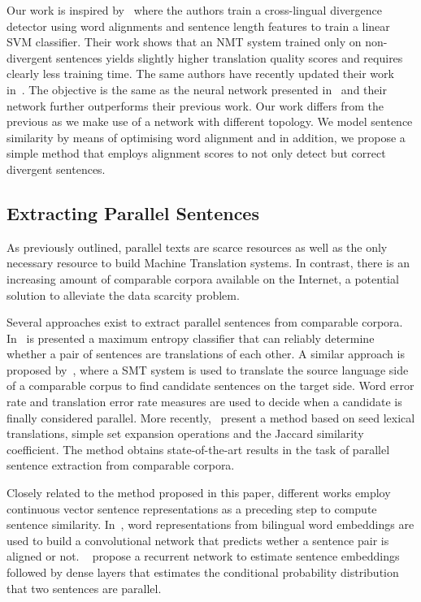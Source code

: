 \documentclass[11pt,a4paper]{article}
\begin{document}
Our work is inspired by~\cite{W17-3209} where the authors train a cross-lingual divergence detector using word alignments and sentence length features to train a linear SVM classifier. Their work shows that an NMT system trained only on non-divergent sentences yields slightly higher translation quality scores and requires clearly less training time. The same authors have recently updated their work in~\cite{DBLP:journals/corr/abs-1803-11112}. The objective is the same as the neural network presented in~\cite{N16-1108} and their network further outperforms their previous work. Our work differs from the previous as we make use of a network with different topology. We model sentence similarity by means of optimising word alignment and in addition, we propose a simple method that employs alignment scores to not only detect but correct divergent sentences.

\subsection{Extracting Parallel Sentences}

As previously outlined, parallel texts are scarce resources as well as the only necessary resource to build Machine Translation systems. In contrast, there is an increasing amount of comparable corpora available on the Internet, a potential solution to alleviate the data scarcity problem.

Several approaches exist to extract parallel sentences from comparable corpora. 
In~\cite{J05-4003} is presented a maximum entropy classifier that can reliably determine whether a pair of sentences are translations of each other. 
A similar approach is proposed by~\cite{E09-1003}, where a SMT system is used to translate the source language side of a comparable corpus to find candidate sentences on the target side. 
Word error rate and translation error rate measures are used to decide when a candidate is finally considered parallel. 
More recently,~\cite{W17-2508} present a method based on seed lexical translations, simple set expansion operations and the Jaccard similarity coefficient. The method obtains state-of-the-art results in the task of parallel sentence extraction from comparable corpora.

Closely related to the method proposed in this paper, different works employ continuous vector sentence representations as a preceding step to compute sentence similarity. 
In~\cite{W15-1521}, word representations from bilingual word embeddings are used to build a convolutional network that predicts wether a sentence pair is aligned or not.
~\cite{W17-2509} propose a recurrent network to estimate sentence embeddings followed by dense layers that estimates the conditional probability distribution that two sentences are parallel.
\end{document}
